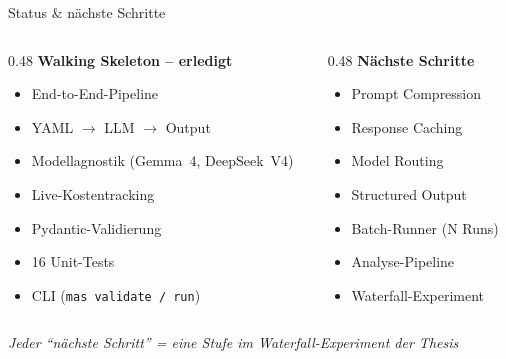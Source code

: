 \documentclass[aspectratio=169, 12pt]{beamer}
\begin{document}
\begin{frame}{Status \& n\"achste Schritte}

\begin{columns}[T]
\begin{column}{0.48\textwidth}
\textbf{Walking Skeleton -- erledigt} \checkmark
\begin{itemize}\small
    \item[\checkmark] End-to-End-Pipeline
    \item[\checkmark] YAML $\rightarrow$ LLM $\rightarrow$ Output
    \item[\checkmark] Modellagnostik (Gemma~4, DeepSeek~V4)
    \item[\checkmark] Live-Kostentracking
    \item[\checkmark] Pydantic-Validierung
    \item[\checkmark] 16 Unit-Tests
    \item[\checkmark] CLI (\texttt{mas validate / run})
\end{itemize}
\end{column}

\begin{column}{0.48\textwidth}
\textbf{Nächste Schritte}
\begin{itemize}\small
    \item[{$\square$}] Prompt Compression
    \item[{$\square$}] Response Caching
    \item[{$\square$}] Model Routing
    \item[{$\square$}] Structured Output
    \item[{$\square$}] Batch-Runner (N Runs)
    \item[{$\square$}] Analyse-Pipeline
    \item[{$\square$}] Waterfall-Experiment
\end{itemize}
\end{column}
\end{columns}

\vspace{0.5cm}
\begin{center}
\small\textit{Jeder ``n\"achste Schritt'' = eine Stufe im Waterfall-Experiment der Thesis}
\end{center}

\end{frame}
\end{document}
